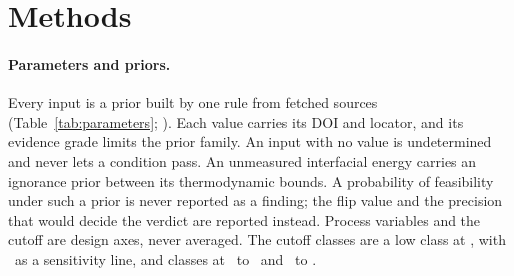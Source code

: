 \section{Methods}\label{sec:methods}

\paragraph*{Parameters and priors.}
Every input is a prior built by one rule from fetched sources (Table~\ref{tab:parameters}; ). %
Each value carries its DOI and locator, and its evidence grade limits the prior family. %
An input with no value is undetermined and never lets a condition pass. %
An unmeasured interfacial energy carries an ignorance prior between its thermodynamic bounds. %
A probability of feasibility under such a prior is never reported as a finding; the flip value and the precision that would decide the verdict are reported instead. %
Process variables and the cutoff are design axes, never averaged. %
The cutoff classes are a low class at \NumClassLo, with \NumClassSensitivity\ as a sensitivity line, and classes at \NumClassMidLow\ to \NumClassMidHigh\ and \NumClassHiLow\ to \NumClassHiHigh. %

\begin{table}[t]
\caption{Sourced inputs of the dissolution test: value, sourced range, prior family, grade of the best source and the sources; every other input, with its full provenance, is in .}
\label{tab:parameters}
\nacreParameterTable
\end{table}

